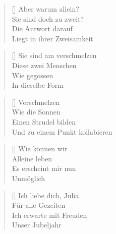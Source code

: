 \documentclass[twocolumn]{article}
\newenvironment{Strophe}{\begin{minipage}{\versewidth} \begin{verse}[\versewidth]}{\end{verse} \end{minipage}\vspace{0.5em}}
\begin{document}
	\begin{Strophe}	
		Aber warum allein? \\
		Sie sind doch zu zweit? \\
		Die Antwort darauf \\
		Liegt in ihrer Zweisamkeit \\
	\end{Strophe}
	
	\begin{Strophe}	
		Sie sind am verschmelzen \\
		Diese zwei Menschen \\
		Wie gegossen \\
		In dieselbe Form \\
	\end{Strophe}
	
	\begin{Strophe}
		Verschmelzen \\
		Wie die Sonnen \\
		Einen Strudel bilden \\
		Und zu einem Punkt kollabieren \\
	\end{Strophe}
	
	\begin{Strophe}
		Wie können wir \\
		Alleine leben \\
		Es erscheint mir nun \\
		Unmöglich \\
	\end{Strophe}
	
	\begin{Strophe}
		Ich liebe dich, Julia \\
		Für alle Gezeiten \\
		Ich erwarte mit Freuden \\
		Unser Jubeljahr \\
	\end{Strophe}
\end{document}
